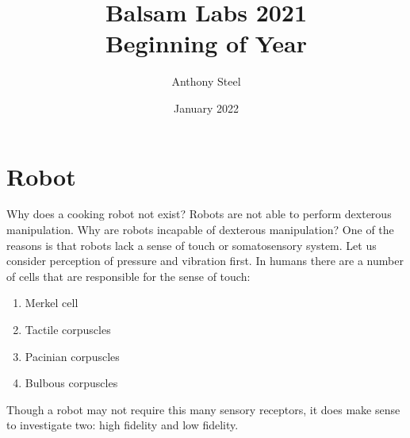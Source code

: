\documentclass[12pt, letterpaper, twoside]{article}
\title{Balsam Labs 2021\\ Beginning of Year}
\author{Anthony Steel}
\date{January 2022}
\begin{document}
\begin{titlepage}
\maketitle
\end{titlepage}
\section*{Robot}
Why does a cooking robot not exist? Robots are not able to perform
dexterous manipulation. Why are robots incapable of dexterous manipulation?
One of the reasons is that robots lack a sense of touch or somatosensory
system. Let us consider perception of pressure and vibration first.
In humans there are a number of cells that are responsible
for the sense of touch:
\begin{enumerate}
\item Merkel cell
\item Tactile corpuscles
\item Pacinian corpuscles
\item Bulbous corpuscles
\end{enumerate}
Though a robot may not require this many sensory receptors,
it does make sense to investigate two: high fidelity and low fidelity.
\end{document}
